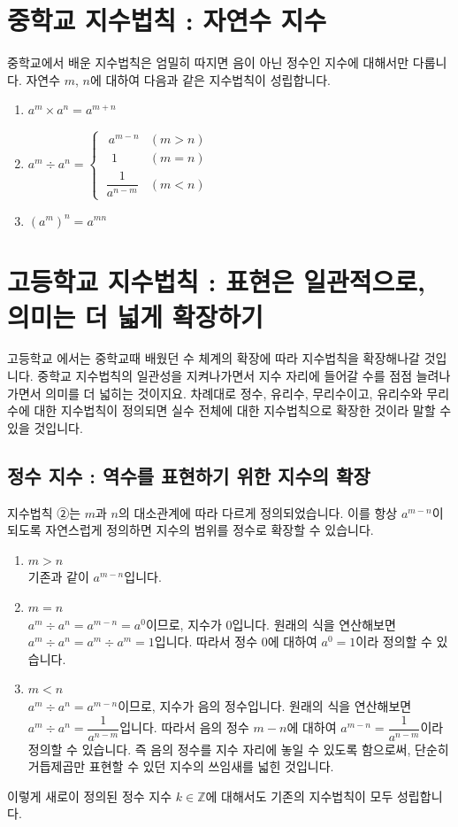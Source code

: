 \section{중학교 지수법칙 : 자연수 지수}
중학교에서 배운 지수법칙은 엄밀히 따지면 음이 아닌 정수인 지수에 대해서만 다룹니다. 자연수 $m$, $n$에 대하여 다음과 같은 지수법칙이 성립합니다.

\begin{enumerate}[label=\onum*]
  \item $a^m \times a^n = a^{m+n}$
  \item $a^m \div a^n =
  \begin{cases}
  \:\:a^{m-n}& (m>n)\\
  \:\:\:1&(m=n)\\
  \:\dfrac{1}{a^{n-m}}& (m<n)
  \end{cases}$
  \item $\left( a^m \right)^{n} = a^{mn}$
\end{enumerate}

\section{고등학교 지수법칙 : 표현은 일관적으로, 의미는 더 넓게 확장하기}
고등학교 에서는 중학교때 배웠던 수 체계의 확장에 따라 지수법칙을 확장해나갈 것입니다. 중학교 지수법칙의 일관성을 지켜나가면서 지수 자리에 들어갈 수를 점점 늘려나가면서 의미를 더 넓히는 것이지요. 차례대로 정수, 유리수, 무리수이고, 유리수와 무리수에 대한 지수법칙이 정의되면 실수 전체에 대한 지수법칙으로 확장한 것이라 말할 수 있을 것입니다.

\subsection{정수 지수 : 역수를 표현하기 위한 지수의 확장}
지수법칙 ②는 $m$과 $n$의 대소관계에 따라 다르게 정의되었습니다. 이를 항상 $a^{m-n}$이 되도록 자연스럽게 정의하면 지수의 범위를 정수로 확장할 수 있습니다.
\begin{enumerate}[label={\onum*}]
    \item $m>n$ \\
    기존과 같이 $a^{m-n}$입니다.
    \item $m=n$\\
    $a^m \div a^n = a^{m-n}=a^0$이므로, 지수가 $0$입니다. 원래의 식을 연산해보면 $a^m \div a^n = a^m \div a^m = 1$입니다. 따라서 정수 $0$에 대하여 $a^0=1$이라 정의할 수 있습니다. 
    \item $m<n$\\
    $a^m \div a^n = a^{m-n}$이므로, 지수가 음의 정수입니다. 원래의 식을 연산해보면 $a^m \div a^n=\dfrac{1}{a^{n-m}}$입니다. 따라서 음의 정수 $m-n$에 대하여 $a^{m-n}=\dfrac{1}{a^{n-m}}$이라 정의할 수 있습니다. 즉 음의 정수를 지수 자리에 놓일 수 있도록 함으로써, 단순히 거듭제곱만 표현할 수 있던 지수의 쓰임새를 넓힌 것입니다. 
\end{enumerate}
이렇게 새로이 정의된 정수 지수 $k \in \mathbb Z$에 대해서도 기존의 지수법칙이 모두 성립합니다. 

